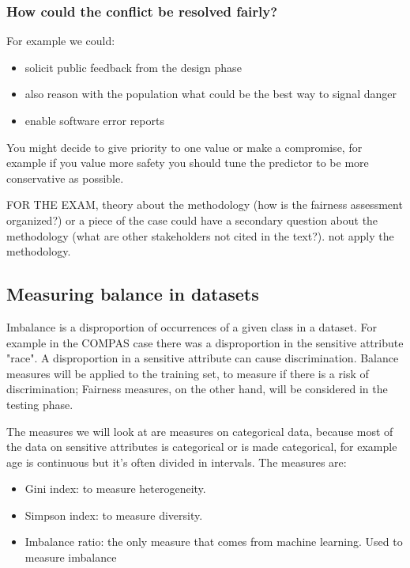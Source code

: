 \subsubsection{How could the conflict be resolved fairly?}
For example we could:
\begin{itemize}
    \item solicit public feedback from the design phase
    \item also reason with the population what could be the best way to signal danger
    \item enable software error reports
\end{itemize}
You might decide to give priority to one value or make a compromise, for example if you value more safety you should tune the predictor to be more conservative as possible.

FOR THE EXAM, theory about the methodology (how is the fairness assessment organized?) or a piece of the case could have a secondary question about the methodology (what are other stakeholders not cited in the text?). not apply the methodology.

\subsection{Measuring balance in datasets}
Imbalance is a disproportion of occurrences of a given class in a dataset. For example in the COMPAS case there was a disproportion in the sensitive attribute "race". A disproportion in a sensitive attribute can cause discrimination. Balance measures will be applied to the training set, to measure if there is a risk of discrimination; Fairness measures, on the other hand, will be considered in the testing phase.

The measures we will look at are measures on categorical data, because most of the data on sensitive attributes is categorical or is made categorical, for example age is continuous but it's often divided in intervals. The measures are:
\begin{itemize}
    \item Gini index: to measure heterogeneity. 
    \item Simpson index: to measure diversity.
    \item Imbalance ratio: the only measure that comes from machine learning. Used to measure imbalance
\end{itemize}
